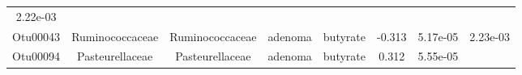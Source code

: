 \documentclass[11pt,]{article}
\begin{document}
\begin{longtable}[]{@{}cccccccc@{}}
\begin{minipage}[t]{0.08\columnwidth}
2.22e-03\strut
\end{minipage}\tabularnewline
\begin{minipage}[t]{0.08\columnwidth}\centering\strut
Otu00043\strut
\end{minipage} & \begin{minipage}[t]{0.15\columnwidth}\centering\strut
Ruminococcaceae\strut
\end{minipage} & \begin{minipage}[t]{0.15\columnwidth}\centering\strut
Ruminococcaceae\strut
\end{minipage} & \begin{minipage}[t]{0.08\columnwidth}\centering\strut
adenoma\strut
\end{minipage} & \begin{minipage}[t]{0.09\columnwidth}\centering\strut
butyrate\strut
\end{minipage} & \begin{minipage}[t]{0.07\columnwidth}\centering\strut
-0.313\strut
\end{minipage} & \begin{minipage}[t]{0.08\columnwidth}\centering\strut
5.17e-05\strut
\end{minipage} & \begin{minipage}[t]{0.08\columnwidth}\centering\strut
2.23e-03\strut
\end{minipage}\tabularnewline
\begin{minipage}[t]{0.08\columnwidth}\centering\strut
Otu00094\strut
\end{minipage} & \begin{minipage}[t]{0.15\columnwidth}\centering\strut
Pasteurellaceae\strut
\end{minipage} & \begin{minipage}[t]{0.15\columnwidth}\centering\strut
Pasteurellaceae\strut
\end{minipage} & \begin{minipage}[t]{0.08\columnwidth}\centering\strut
adenoma\strut
\end{minipage} & \begin{minipage}[t]{0.09\columnwidth}\centering\strut
butyrate\strut
\end{minipage} & \begin{minipage}[t]{0.07\columnwidth}\centering\strut
0.312\strut
\end{minipage} & \begin{minipage}[t]{0.08\columnwidth}\centering\strut
5.55e-05\strut
\end{minipage} & \begin{minipage}[t]{0.08\columnwidth}\centering\strut

\end{minipage}
\end{longtable}
\end{document}
